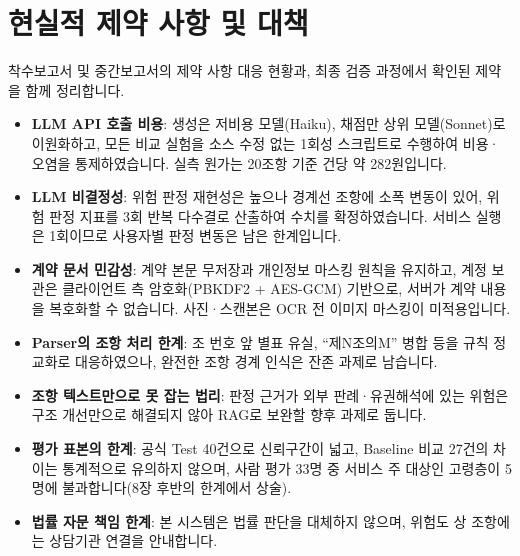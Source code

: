 \documentclass[10pt,a4paper]{article}
\begin{document}
\section{현실적 제약 사항 및 대책}
착수보고서 및 중간보고서의 제약 사항 대응 현황과, 최종 검증 과정에서 확인된 제약을 함께 정리합니다.
\begin{itemize}
\item \textbf{LLM API 호출 비용}: 생성은 저비용 모델(Haiku), 채점만 상위 모델(Sonnet)로 이원화하고, 모든 비교 실험을 소스 수정 없는 1회성 스크립트로 수행하여 비용·오염을 통제하였습니다. 실측 원가는 20조항 기준 건당 약 282원입니다.
\item \textbf{LLM 비결정성}: 위험 판정 재현성은 높으나 경계선 조항에 소폭 변동이 있어, 위험 판정 지표를 3회 반복 다수결로 산출하여 수치를 확정하였습니다. 서비스 실행은 1회이므로 사용자별 판정 변동은 남은 한계입니다.
\item \textbf{계약 문서 민감성}: 계약 본문 무저장과 개인정보 마스킹 원칙을 유지하고, 계정 보관은 클라이언트 측 암호화(PBKDF2 + AES-GCM) 기반으로, 서버가 계약 내용을 복호화할 수 없습니다. 사진·스캔본은 OCR 전 이미지 마스킹이 미적용입니다.
\item \textbf{Parser의 조항 처리 한계}: 조 번호 앞 별표 유실, ``제N조의M'' 병합 등을 규칙 정교화로 대응하였으나, 완전한 조항 경계 인식은 잔존 과제로 남습니다.
\item \textbf{조항 텍스트만으로 못 잡는 법리}: 판정 근거가 외부 판례·유권해석에 있는 위험은 구조 개선만으로 해결되지 않아 RAG로 보완할 향후 과제로 둡니다.
\item \textbf{평가 표본의 한계}: 공식 Test 40건으로 신뢰구간이 넓고, Baseline 비교 27건의 차이는 통계적으로 유의하지 않으며, 사람 평가 33명 중 서비스 주 대상인 고령층이 5명에 불과합니다(8장 후반의 한계에서 상술).
\item \textbf{법률 자문 책임 한계}: 본 시스템은 법률 판단을 대체하지 않으며, 위험도 상 조항에는 상담기관 연결을 안내합니다.
\end{itemize}

\end{document}
